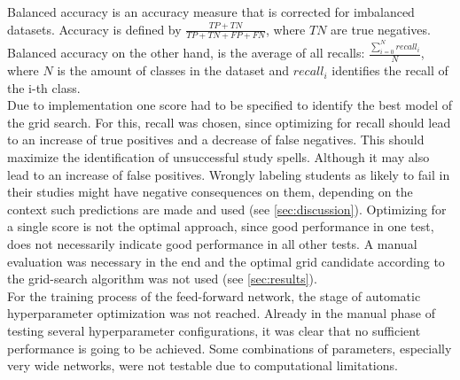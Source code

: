 Balanced accuracy is an accuracy measure that is corrected for imbalanced datasets. Accuracy is defined by $\frac{TP+TN}{TP+TN+FP+FN}$, where $TN$ are true negatives. Balanced accuracy on the other hand, is the average of all recalls: $\frac{\sum_{i=0}^{N}recall_i}{N}$, where $N$ is the amount of classes in the dataset and $recall_i$ identifies the recall of the i-th class.\\
Due to implementation one score had to be specified to identify the best model of the grid search. For this, recall was chosen, since optimizing for recall should lead to an increase of true positives and a decrease of false negatives. This should maximize the identification of unsuccessful study spells. Although it may also lead to an increase of false positives. Wrongly labeling students as likely to fail in their studies might have negative consequences on them, depending on the context such predictions are made and used (see \ref{sec:discussion}). Optimizing for a single score is not the optimal approach, since good performance in one test, does not necessarily indicate good performance in all other tests. A manual evaluation was necessary in the end and the optimal grid candidate according to the grid-search algorithm was not used (see \ref{sec:results}).\\
For the training process of the feed-forward network, the stage of automatic hyperparameter optimization was not reached. Already in the manual phase of testing several hyperparameter configurations, it was clear that no sufficient performance is going to be achieved. Some combinations of parameters, especially very wide networks, were not testable due to computational limitations.

